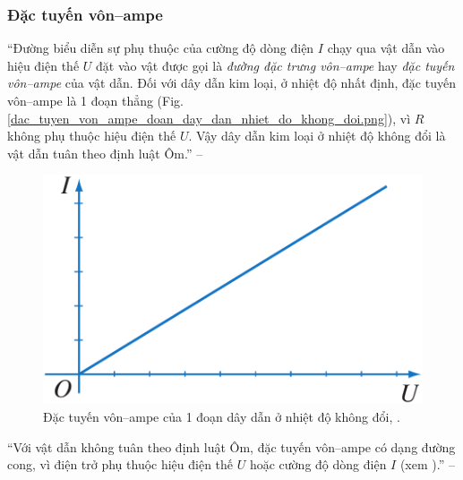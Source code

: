 \documentclass[oneside]{book}
\numberwithin{equation}{section}
\begin{document}
\subsubsection{Đặc tuyến vôn--ampe}
``Đường biểu diễn sự phụ thuộc của cường độ dòng điện $I$ chạy qua vật dẫn vào hiệu điện thế $U$ đặt vào vật được gọi là \textit{đường đặc trưng vôn--ampe} hay \textit{đặc tuyến vôn--ampe} của vật dẫn. Đối với dây dẫn kim loại, ở nhiệt độ nhất định, đặc tuyến vôn--ampe là 1 đoạn thẳng (Fig. \ref{dac_tuyen_von_ampe_doan_day_dan_nhiet_do_khong_doi.png}), vì $R$ không phụ thuộc hiệu điện thế $U$. Vậy dây dẫn kim loại ở nhiệt độ không đổi là vật dẫn tuân theo định luật Ôm.'' -- \cite[pp. 49--50]{SGK_Vat_Ly_11_nang_cao}

\begin{figure}[H]
	\centering
	\includegraphics[scale=0.15]{dac_tuyen_von_ampe_doan_day_dan_nhiet_do_khong_doi}
	\caption{Đặc tuyến vôn--ampe của 1 đoạn dây dẫn ở nhiệt độ không đổi, \cite[Hình 10.2, p. 50]{SGK_Vat_Ly_11_nang_cao}.}
	\label{fig:dac_tuyen_von_ampe_doan_day_dan_nhiet_do_khong_doi}
\end{figure}
``Với vật dẫn không tuân theo định luật Ôm, đặc tuyến vôn--ampe có dạng đường cong, vì điện trở phụ thuộc hiệu điện thế $U$ hoặc cường độ dòng điện $I$ (xem \cite[Chap. IIi]{SGK_Vat_Ly_11_nang_cao}).'' -- \cite[p. 50]{SGK_Vat_Ly_11_nang_cao}
\end{document}
